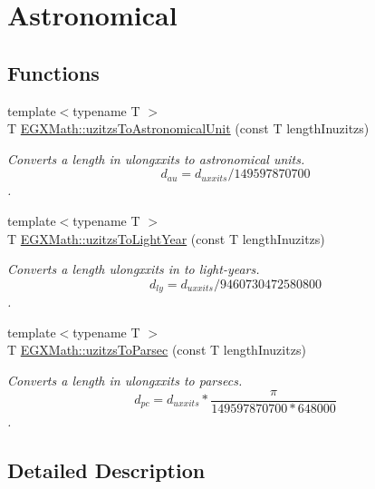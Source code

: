 \hypertarget{group___e_g_x_math-_conversions-_length_conversions-uzitzs-_astronomical}{}\section{Astronomical}
\label{group___e_g_x_math-_conversions-_length_conversions-uzitzs-_astronomical}
\subsection*{Functions}
\begin{DoxyCompactItemize}
\item 
{\footnotesize template$<$typename T $>$ }\\T \mbox{\hyperlink{group___e_g_x_math-_conversions-_length_conversions-uzitzs-_astronomical_ga5b92a4634ad3e80173c05bc3ff39f079}{E\+G\+X\+Math\+::uzitzs\+To\+Astronomical\+Unit}} (const T length\+Inuzitzs)
\begin{DoxyCompactList}\small\item\em Converts a length in ulongxxits to astronomical units. \[ d_{au}=d_{uxxits} / 149597870700 \]. \end{DoxyCompactList}\item 
{\footnotesize template$<$typename T $>$ }\\T \mbox{\hyperlink{group___e_g_x_math-_conversions-_length_conversions-uzitzs-_astronomical_gaa6ada41d9c8a7516cb5fe8ab01976b27}{E\+G\+X\+Math\+::uzitzs\+To\+Light\+Year}} (const T length\+Inuzitzs)
\begin{DoxyCompactList}\small\item\em Converts a length ulongxxits in to light-\/years. \[ d_{ly}=d_{uxxits} / 9460730472580800 \]. \end{DoxyCompactList}\item 
{\footnotesize template$<$typename T $>$ }\\T \mbox{\hyperlink{group___e_g_x_math-_conversions-_length_conversions-uzitzs-_astronomical_ga028a17a589e3f3d0c09daa6fbe664989}{E\+G\+X\+Math\+::uzitzs\+To\+Parsec}} (const T length\+Inuzitzs)
\begin{DoxyCompactList}\small\item\em Converts a length in ulongxxits to parsecs. \[ d_{pc}=d_{uxxits} * \frac{\pi}{149597870700 * 648000} \]. \end{DoxyCompactList}\end{DoxyCompactItemize}


\subsection{Detailed Description}


